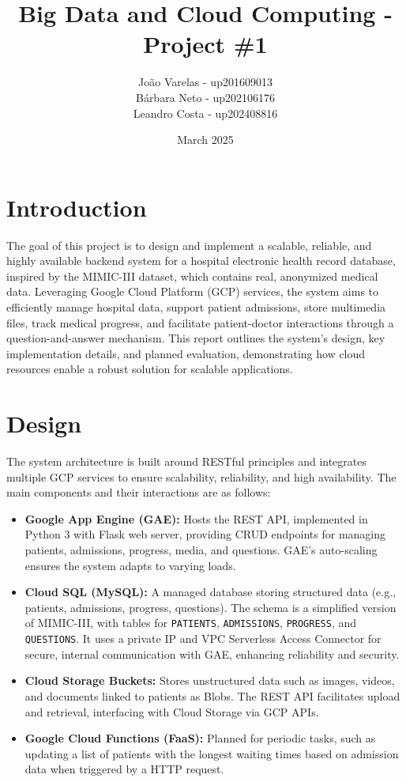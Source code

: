 \documentclass[12pt,a4paper]{article}
\title{Big Data and Cloud Computing - Project \#1}
\author{João Varelas - up201609013 \\ Bárbara Neto - up202106176 \\ Leandro Costa - up202408816}
\date{March 2025}
\begin{document}
\maketitle

\section{Introduction}
The goal of this project is to design and implement a scalable, reliable, and highly available backend system for a hospital electronic health record database, inspired by the MIMIC-III dataset, which contains real, anonymized medical data. Leveraging Google Cloud Platform (GCP) services, the system aims to efficiently manage hospital data, support patient admissions, store multimedia files, track medical progress, and facilitate patient-doctor interactions through a question-and-answer mechanism. This report outlines the system’s design, key implementation details, and planned evaluation, demonstrating how cloud resources enable a robust solution for scalable applications.

\section{Design}
The system architecture is built around RESTful principles and integrates multiple GCP services to ensure scalability, reliability, and high availability. The main components and their interactions are as follows:

\begin{itemize}
    \item \textbf{Google App Engine (GAE):} Hosts the REST API, implemented in Python 3 with Flask web server, providing CRUD endpoints for managing patients, admissions, progress, media, and questions. GAE’s auto-scaling ensures the system adapts to varying loads.
    \item \textbf{Cloud SQL (MySQL):} A managed database storing structured data (e.g., patients, admissions, progress, questions). The schema is a simplified version of MIMIC-III, with tables for \texttt{PATIENTS}, \texttt{ADMISSIONS}, \texttt{PROGRESS}, and \texttt{QUESTIONS}. It uses a private IP and VPC Serverless Access Connector for secure, internal communication with GAE, enhancing reliability and security.
    \item \textbf{Cloud Storage Buckets:} Stores unstructured data such as images, videos, and documents linked to patients as Blobs. The REST API facilitates upload and retrieval, interfacing with Cloud Storage via GCP APIs.
    \item \textbf{Google Cloud Functions (FaaS):} Planned for periodic tasks, such as updating a list of patients with the longest waiting times based on admission data when triggered by  a HTTP request.
\end{itemize}
\end{document}
